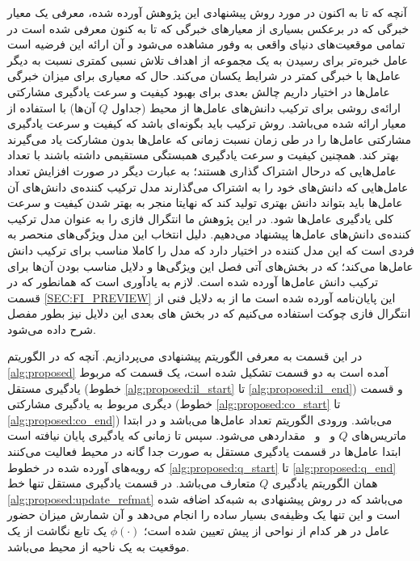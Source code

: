 آنچه که تا به اکنون در مورد روش پیشنهادی این پژوهش آورده شده، معرفی یک معیار خبرگی که در برعکس بسیاری از معیارهای خبرگی که تا به کنون معرفی شده است در تمامی موقعیت‌های دنیای واقعی به وفور مشاهده می‌شود و آن ارائه این فرضیه است عامل خبره‌تر برای رسیدن به یک مجموعه از اهداف تلاش نسبی کمتری نسبت به دیگر عامل‌ها با خبرگی کمتر در شرایط یکسان می‌کند. حال که معیاری برای میزان خبرگی عامل‌ها در اختیار داریم چالش بعدی برای بهبود کیفیت و سرعت یادگیری مشارکتی ارائه‌ی روشی برای ترکیب دانش‌های عامل‌ها از محیط (جداول $Q$ آن‌ها) با استفاده از معیار ارائه شده می‌باشد. روش ترکیب باید بگونه‌ای باشد که کیفیت و سرعت یادگیری مشارکتی عامل‌ها را در طی زمان نسبت زمانی که عامل‌ها بدون مشارکت یاد می‌گیرند بهتر کند. همچنین کیفیت و سرعت یادگیری همبستگی مستقیمی داشته باشند با تعداد عامل‌هایی که درحال اشتراک گذاری هستند؛ به عبارت دیگر در صورت افزایش تعداد عامل‌هایی که دانش‌های خود را به اشتراک می‌گذارند مدل ترکیب کننده‌ی دانش‌های آن‌ عامل‌ها باید بتواند دانش‌ بهتری تولید کند که نهایتا منجر به بهتر شدن کیفیت و سرعت کلی یادگیری عامل‌ها شود.
در این پژوهش ما انتگرال فازی را به عنوان مدل ترکیب کننده‌ی دانش‌های عامل‌ها پیشنهاد می‌دهیم. دلیل انتخاب این مدل ویژگی‌های منحصر به فردی است که این مدل کننده در اختیار دارد که مدل را کاملا مناسب برای ترکیب دانش‌ عامل‌ها می‌کند؛ که در بخش‌های آتی فصل این ویژگی‌ها و دلایل مناسب بودن آن‌ها برای ترکیب دانش عامل‌ها آورده شده است. لازم به یاد‌آوری است که همانطور که در قسمت
\ref{SEC:FI_PREVIEW}
این پایان‌نامه آورده شده است ما از به دلایل فنی از انتگرال فازی چوکت استفاده می‌کنیم که در بخش‌ های بعدی این دلایل نیز بطور مفصل شرح داده می‌شود.

در این قسمت به معرفی الگوریتم پیشنهادی می‌پردازیم. آنچه که در الگوریتم
\ref{alg:proposed}
آمده است به دو قسمت تشکیل شده است، یک قسمت که مربوط یادگیری مستقل (خطوط
\ref{alg:proposed:il_start} تا \ref{alg:proposed:il_end})
و قسمت دیگری مربوط به یادگیری مشارکتی (خطوط
\ref{alg:proposed:co_start} تا \ref{alg:proposed:co_end})
می‌باشد. ورودی الگوریتم تعداد عامل‌ها می‌باشد و در ابتدا ماتریس‌های $Q$ و \ و \ مقداردهی می‌شود. سپس تا زمانی که یادگیری پایان نیافته است ابتدا عامل‌ها در قسمت یادگیری مستقل به صورت جدا گانه در محیط فعالیت می‌کنند که رویه‌های آورده شده در خطوط
\ref{alg:proposed:q_start} تا \ref{alg:proposed:q_end}
همان الگوریتم یادگیری $Q$ متعارف می‌باشد. در قسمت یادگیری مستقل تنها خط
\ref{alg:proposed:update_refmat}
می‌باشد که در روش پیشنهادی به شبه‌کد اضافه شده است و این تنها یک وظیفه‌ی بسیار ساده را انجام می‌دهد و آن شمارش میزان حضور عامل در هر کدام از نواحی از پیش تعیین شده است؛ $\phi(\cdot)$ یک تابع نگاشت از یک موقعیت به یک ناحیه از محیط می‌باشد.

